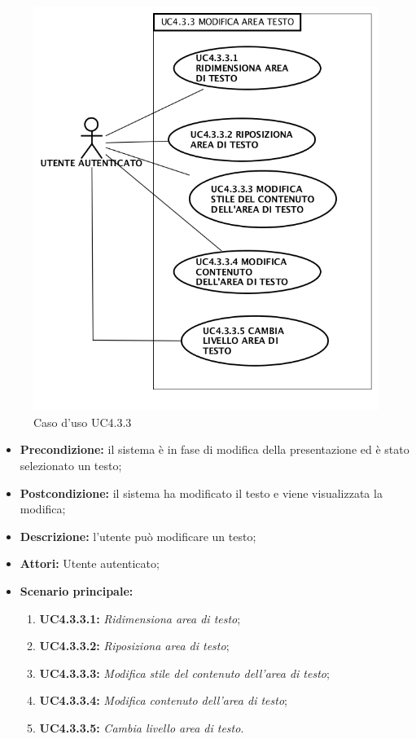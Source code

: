 \begin{figure}[H]
	\begin{center}
	\includegraphics[scale=0.4]{diagram/UC4-3-3.png}
	\caption{Caso d'uso UC4.3.3}
	\end{center}
\end{figure}
\begin{itemize}
	\item \textbf{Precondizione:} il sistema è in fase di modifica della presentazione ed è stato selezionato un testo;
	\item \textbf{Postcondizione:} il sistema ha modificato il testo e viene visualizzata la modifica;
	\item \textbf{Descrizione:} l'utente può modificare un testo;
	\item \textbf{Attori:} Utente autenticato;
	\item \textbf{Scenario principale:}
	\begin{enumerate}
		\item \textbf{ UC4.3.3.1:} \textit{ Ridimensiona area di testo};
		\item \textbf{ UC4.3.3.2:} \textit{ Riposiziona area di testo};
		\item \textbf{ UC4.3.3.3:} \textit{ Modifica stile del contenuto dell'area di testo};
		\item \textbf{ UC4.3.3.4:} \textit{ Modifica contenuto dell'area di testo};
		\item \textbf{ UC4.3.3.5:} \textit{ Cambia livello area di testo}.
	\end{enumerate}
\end{itemize}
